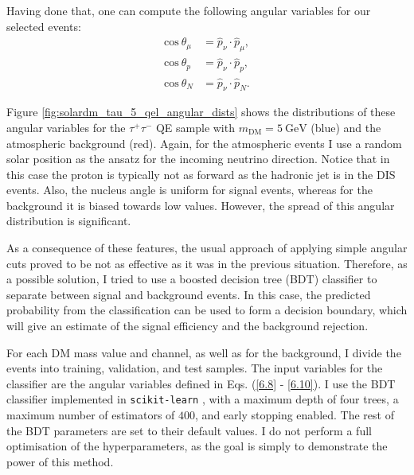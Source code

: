 Having done that, one can compute the following angular variables for our selected events:
\begin{align}
	\mathrm{cos} \ \theta_{\mu} &= \hat{p}_{\nu} \cdot \hat{p}_{\mu},\label{6.8} \\
	\mathrm{cos} \ \theta_{p} &= \hat{p}_{\nu} \cdot \hat{p}_{p},\label{6.9} \\
	\mathrm{cos} \ \theta_{N} &= \hat{p}_{\nu} \cdot \hat{p}_{N}. \label{6.10}
\end{align}

Figure \ref{fig:solardm_tau_5_qel_angular_dists} shows the distributions of these angular variables for the $\tau^{+}\tau^{-}$ QE sample with $m_{\mathrm{DM}} = 5 \ \mathrm{GeV}$ (blue) and the atmospheric background (red). Again, for the atmospheric events I use a random solar position as the ansatz for the incoming neutrino direction. Notice that in this case the proton is typically not as forward as the hadronic jet is in the DIS events. Also, the nucleus angle is uniform for signal events, whereas for the background it is biased towards low values. However, the spread of this angular distribution is significant.

As a consequence of these features, the usual approach of applying simple angular cuts proved to be not as effective as it was in the previous situation. Therefore, as a possible solution, I tried to use a boosted decision tree (BDT) classifier to separate between signal and background events. In this case, the predicted probability from the classification can be used to form a decision boundary, which will give an estimate of the signal efficiency and the background rejection.

For each DM mass value and channel, as well as for the background, I divide the events into training, validation, and test samples. The input variables for the classifier are the angular variables defined in Eqs. (\ref{6.8} - \ref{6.10}). I use the BDT classifier implemented in \texttt{scikit-learn} \cite{scikit-learn}, with a maximum depth of four trees, a maximum number of estimators of $400$, and early stopping enabled. The rest of the BDT parameters are set to their default values. I do not perform a full optimisation of the hyperparameters, as the goal is simply to demonstrate the power of this method.

